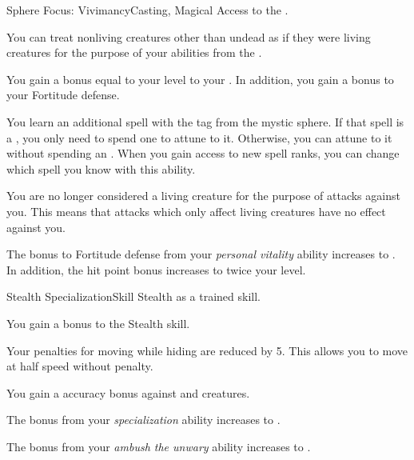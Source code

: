     \begin{feat}{Sphere Focus: Vivimancy}{Casting, Magical}
        \featpre Access to the  .

         You can treat nonliving creatures other than undead as if they were living creatures for the purpose of your abilities from the  .

         You gain a bonus equal to your level to your .
        In addition, you gain a  bonus to your Fortitude defense.

         You learn an additional spell with the  tag from the  mystic sphere.
        If that spell is a , you only need to spend one  to attune to it.
        Otherwise, you can attune to it without spending an .
        When you gain access to new spell ranks, you can change which spell you know with this ability.

         You are no longer considered a living creature for the purpose of attacks against you.
        This means that attacks which only affect living creatures have no effect against you.

         The bonus to Fortitude defense from your \textit{personal vitality} ability increases to .
        In addition, the hit point bonus increases to twice your level.
    \end{feat}

    \begin{feat}{Stealth Specialization}{Skill}
        \featpre Stealth as a trained skill.

         You gain a  bonus to the Stealth skill.

         Your penalties for moving while hiding are reduced by 5.
        This allows you to move at half speed without penalty.

         You gain a  accuracy bonus against \unaware and \partiallyunaware creatures.

         The bonus from your \textit{specialization} ability increases to .

         The bonus from your \textit{ambush the unwary} ability increases to .
    \end{feat}

